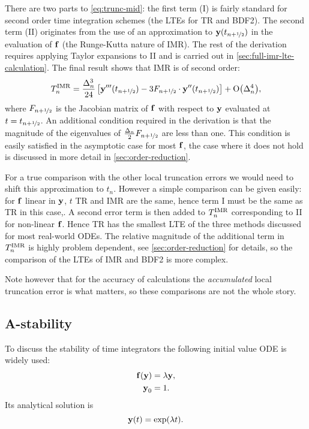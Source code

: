 There are two parts to \cref{eq:trunc-mid}: the first term (I) is fairly standard for second order time integration schemes (\cf the LTEs for TR and BDF2).
The second term (II) originates from the use of an approximation to $\boldsymbol{\mathrm{y}}(t_{n+\nicefrac{1}{2}})$ in the evaluation of ${\boldsymbol{\mathrm{f}}}$ (\ie the Runge-Kutta nature of IMR).
The rest of the derivation requires applying Taylor expansions to II and is carried out in \cref{sec:full-imr-lte-calculation}.
The final result shows that IMR is of second order:
\begin{equation}
  \lte^\imr = \frac{\dtn^3}{24} \left[\yvhf['''] - 3 \dfdyhf \cdot \yvhf[''] \right]
  + \order{\dtn^4},
  \label{eq:trunc-final}
\end{equation}
where $F_{n+\nicefrac{1}{2}}$ is the Jacobian matrix of ${\boldsymbol{\mathrm{f}}}$ with respect to $\boldsymbol{\mathrm{y}}$ evaluated at $t=t_{n+\nicefrac{1}{2}}$.
An additional condition required in the derivation is that the magnitude of the eigenvalues of $\frac{\Delta_{n}}{2}F_{n+\nicefrac{1}{2}}$ are less than one.
This condition is easily satisfied in the asymptotic case for most ${\boldsymbol{\mathrm{f}}}$, the case where it does not hold is discussed in more detail in \cref{sec:order-reduction}.

For a true comparison with the other local truncation errors we would need to shift this approximation to $t_n$.
However a simple comparison can be given easily: for ${\boldsymbol{\mathrm{f}}}$ linear in $\boldsymbol{\mathrm{y}}$, $t$ TR and IMR are the same, hence term I must be the same as TR in this case,.
A second error term is then added to $T_n^{\mathrm{IMR}}$ corresponding to II for non-linear ${\boldsymbol{\mathrm{f}}}$.
Hence TR has the smallest LTE of the three methods discussed for most real-world ODEs.
The relative magnitude of the additional term in $T_n^{\mathrm{IMR}}$ is highly problem dependent, see \cref{sec:order-reduction} for details, so the comparison of the LTEs of IMR and BDF2 is more complex.

Note however that for the accuracy of calculations the \emph{accumulated} local truncation error is what matters, so these comparisons are not the whole story.

\subsection{A-stability}
\label{sec:A-stability}

To discuss the stability of time integrators the following initial value ODE is widely used:
\begin{equation}
  \begin{aligned}
    \ffv{\yv} &= \lambda \yv, \\
    \yv_0 &= 1.
    \label{eq:ode-test-f}
  \end{aligned}
\end{equation}
Its analytical solution is
\begin{equation}
  \boldsymbol{\mathrm{y}}(t) = \exp(\lambda t).
\end{equation}

